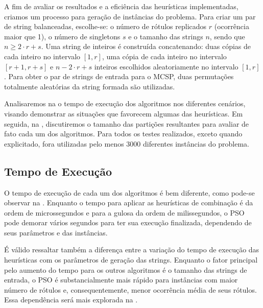 A fim de avaliar os resultados e a eficiência das heurísticas implementadas, criamos um processo para geração de instâncias do problema. Para criar um par de string balanceadas, escolhe-se: o número de rótulos replicados $r$ (ocorrência maior que 1), o número de singletons $s$ e o tamanho das strings $n$, sendo que $n \ge 2 \cdot r + s$. Uma string de inteiros é construída concatenando: duas cópias de cada inteiro no intervalo $[1, r]$, uma cópia de cada inteiro no intervalo $[r + 1, r + s]$ e $n - 2 \cdot r + s$ inteiros escolhidos aleatoriamente no intervalo $[1, r]$. Para obter o par de strings de entrada para o MCSP, duas permutações totalmente aleatórias da string formada são utilizadas.

Analisaremos na  o tempo de execução dos algoritmos nos diferentes cenários, visando demonstrar as situações que favorecem algumas das heurísticas. Em seguida, na , discutiremos o tamanho das partições resultantes para avaliar de fato cada um dos algoritmos. Para todos os testes realizados, exceto quando explicitado, fora utilizadas pelo menos 3000 diferentes instâncias do problema.

\subsection{Tempo de Execução} \label{sec:resultados-tempo}

    O tempo de execução de cada um dos algoritmos é bem diferente, como pode-se observar na . Enquanto o tempo para aplicar as heurísticas de combinação é da ordem de microssegundos e para a gulosa da ordem de milissegundos, o PSO pode demorar vários segundos para ter sua execução finalizada, dependendo de seus parâmetros e das instâncias.

    É válido ressaltar também a diferença entre a variação do tempo de execução das heurísticas com os parâmetros de geração das strings. Enquanto o fator principal pelo aumento do tempo para os outros algoritmos é o tamanho das strings de entrada, o PSO é substancialmente mais rápido para instâncias com maior número de rótulos e, consequentemente, menor ocorrência média de seus rótulos. Essa dependência será mais explorada na .

